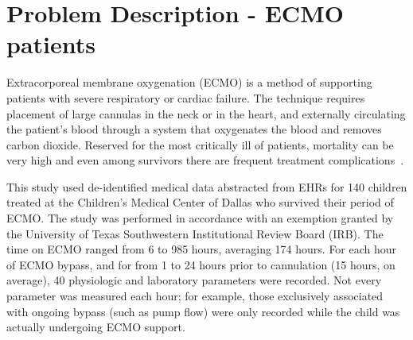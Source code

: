 \documentclass[letterpaper]{article} %
\begin{document}
\section{Problem Description - ECMO patients}
Extracorporeal membrane oxygenation (ECMO) is a method of supporting patients with severe respiratory or cardiac failure. The technique requires placement of large cannulas in the neck or in the heart, and externally circulating the patient's blood through a system that oxygenates the blood and removes carbon dioxide. Reserved for the most critically ill of patients, mortality can be very high and even among survivors there are frequent treatment complications~\cite{lin2017extracorporeal}.

This study used de-identified medical data abstracted from EHRs for 140 children treated at the Children's Medical Center of Dallas who survived their period of ECMO. The study was performed in accordance with an exemption granted by the University of Texas Southwestern Institutional Review Board (IRB). The time on ECMO ranged from 6 to 985 hours, averaging 174 hours. For each hour of ECMO bypass, and for from 1 to 24 hours prior to cannulation (15 hours, on average), 40 physiologic and laboratory parameters were recorded. Not every parameter was measured each hour; for example, those exclusively associated with ongoing bypass (such as pump flow) were only recorded while the child was actually undergoing ECMO support.
\end{document}
